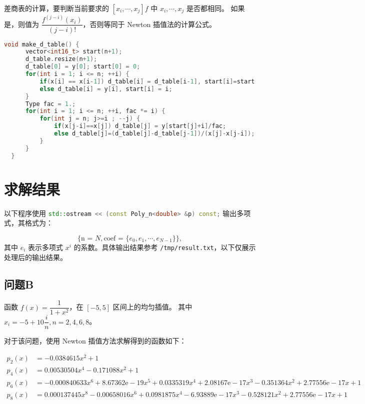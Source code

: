 \documentclass[lang=cn,a4paper,newtx,bibend=bibtex]{elegantpaper}
\begin{document}
差商表的计算，要判断当前要求的 $[x_i, \cdots, x_j]f$ 中 $x_i, \cdots, x_j$ 是否都相同。
如果是，则值为 $\dfrac{f^{(j-i)}(x_i)}{(j-i)!}$，否则等同于 Newton 插值法的计算公式。

\begin{lstlisting}[language=C++]
  void make_d_table() {
      vector<int16_t> start(n+1);
      d_table.resize(n+1);
      d_table[0] = y[0]; start[0] = 0;
      for(int i = 1; i <= n; ++i) {
          if(x[i] == x[i-1]) d_table[i] = d_table[i-1], start[i]=start[i-1];
          else d_table[i] = y[i], start[i] = i;
      }
      Type fac = 1.;
      for(int i = 1; i <= n; ++i, fac *= i) {
          for(int j = n; j>=i ; --j) {
              if(x[j-i]==x[j]) d_table[j] = y[start[j]+i]/fac;
              else d_table[j]=(d_table[j]-d_table[j-1])/(x[j]-x[j-i]);
          }
      }
  }
\end{lstlisting}


\section{求解结果}

以下程序使用 \lstinline[language=C++]{std::ostream << (const Poly_n<double> &p) const;}
输出多项式，其格式为：

\[
  \{\text{n = } N, \text{coef = } \{e_0, e_1, \cdots, e_{N-1}\}\},
\]
其中 $e_{i}$ 表示多项式 $x^i$ 的系数。具体输出结果参考 \lstinline{/tmp/result.txt}，以下仅展示处理后的输出结果。

\subsection{问题B}

函数 $f(x) = \dfrac{1}{1+x^2}$，在 $[-5, 5]$ 区间上的均匀插值。
其中 $x_i = -5 + 10\dfrac{i}{n}, n = 2, 4, 6, 8$。

对于该问题，使用 Newton 插值方法求解得到的函数如下：

\begin{equation*}
  \begin{aligned}
    p_2(x) &= -0.0384615x^{2}+1 \\
    p_4(x) &= 0.00530504x^{4}-0.171088x^{2}+1 \\
    p_6(x) &= -0.000840633x^{6}+8.67362\mathrm{e}{-}19x^{5}+0.0335319x^{4}+2.08167\mathrm{e}{-}17x^{3}-0.351364x^{2}+2.77556\mathrm{e}{-}17x+1 \\
    p_8(x) &= 0.000137445x^{8}-0.00658016x^{6}+0.0981875x^{4}-6.93889\mathrm{e}{-}17x^{3}-0.528121x^{2}+2.77556\mathrm{e}{-}17x+1 \\
     \end{aligned}
\end{equation*}
\end{document}
